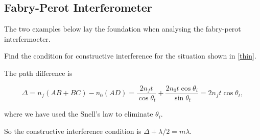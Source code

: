 \documentclass[english,a4paper,12pt]{report}
\begin{document}


\subsection{Fabry-Perot Interferometer}

The two examples below lay the foundation when analysing the fabry-perot interfermoeter.

{Find the condition for constructive interference for the situation shown in \cref{thin}.}
{The path difference is 

\begin{equation}
    \Delta = n_{f}(AB+BC)-n_0 (AD) = \frac{2n_{f}t }{\cos \theta _{t} } + \frac{2n_0 t\cos \theta _{i} }{\sin \theta _{t} } = 2n_{f}t \cos \theta _{t},      
\end{equation}

where we have used the Snell's law to eliminate \(\theta _{i} \).

So the constructive interference condition is \(\Delta + \lambda /2 = m\lambda  \). 
} 
\end{document}
